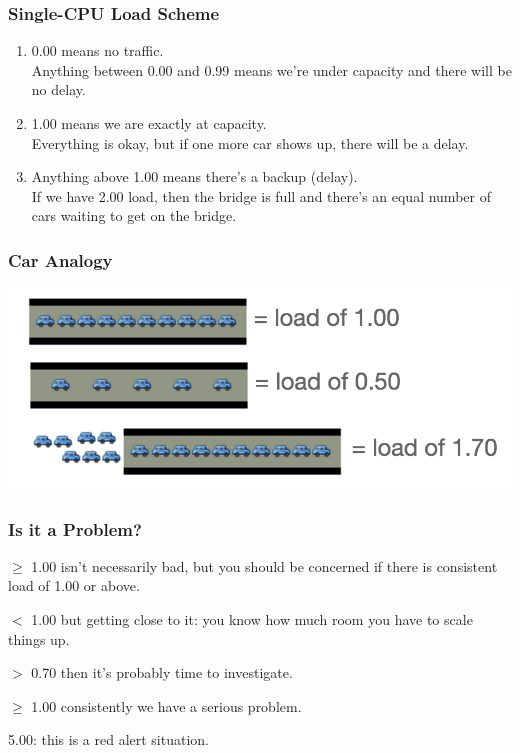 \begin{frame}
\frametitle{Single-CPU Load Scheme}

\large
\begin{changemargin}{1cm}
\begin{enumerate}
	\item 0.00 means no traffic. \\
    Anything between 0.00 and 0.99 means we're under capacity and there will be no delay.\\[1em]
	\item 1.00 means we are exactly at capacity. \\
    Everything is okay, but if one more car shows up, there will be a delay.\\[1em]
	\item Anything above 1.00 means there's a backup (delay). \\
    If we have 2.00 load, then the bridge is full and there's an equal number of cars waiting to get on the bridge. 
\end{enumerate}
\end{changemargin}

\end{frame}



\begin{frame}
\frametitle{Car Analogy}

\begin{center}
	\includegraphics[width=\textwidth]{images/car-analogy.png}
\end{center}

\end{frame}



\begin{frame}
\frametitle{Is it a Problem?}

\large
\begin{changemargin}{1cm}
$\ge$ 1.00 isn't necessarily bad, but you should be concerned if there is consistent load of 1.00 or above. 

$<$ 1.00 but getting close to it: you know how much room you have to scale things up.

$>$ 0.70 then it's probably time to investigate.

$\ge$ 1.00 consistently we have a serious problem. 

5.00: this is a red alert situation.
\end{changemargin}

\end{frame}



